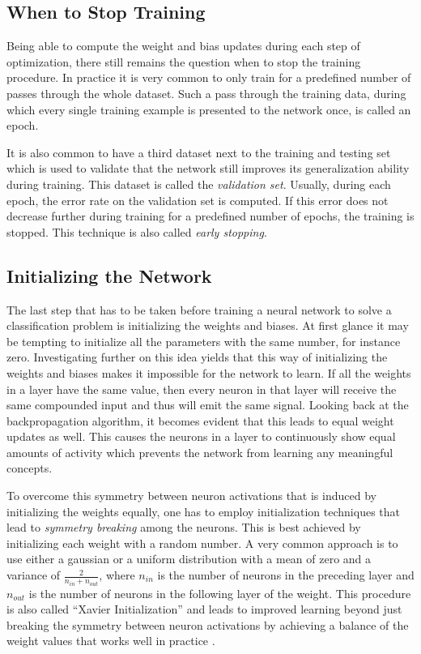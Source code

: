 \subsection{When to Stop Training}

Being able to compute the weight and bias updates during each step of
optimization, there still remains the question when to stop the
training procedure. In practice it is very common to only train for a
predefined number of passes through the whole dataset. Such a pass
through the training data, during which every single training example
is presented to the network once, is called an epoch.

It is also common to have a third dataset next to the training and
testing set which is used to validate that the network still improves
its generalization ability during training. This dataset is called the
\textit{validation set}. Usually, during each epoch,
the error rate on the validation set is computed. If this error does
not decrease further during training for a predefined number of
epochs, the training is stopped. This technique is also called
\textit{early stopping}.

\subsection{Initializing the Network}
\label{sec:xavier}

The last step that has to be taken before training a neural network
to solve a classification problem is initializing the weights and
biases. At first glance it may be tempting to initialize all the
parameters with the same number, for instance zero. Investigating further
on this idea yields that this way of initializing the weights and
biases makes it impossible for the network to learn. If all the
weights in a layer have the same value, then every neuron in that
layer will receive the same compounded input and thus will emit the same
signal. Looking back at the backpropagation algorithm, it becomes
evident that this leads to equal weight updates as well. This causes
the neurons in a layer to continuously show equal amounts of activity
which prevents the network from learning any meaningful concepts.

To overcome this
symmetry between neuron activations that is induced by initializing
the weights equally, one has to employ initialization techniques that
lead to \textit{symmetry breaking} among the neurons. This is best
achieved by initializing each weight with a random number. A very
common approach is to use either a gaussian or a uniform distribution
with a mean of zero and a variance of \(\frac{2}{n_{in} + n_{out}}\),
where \(n_{in}\) is the number of neurons in the preceding layer and
\(n_{out}\) is the number of neurons in the following layer of the
weight. This procedure is also called ``Xavier Initialization'' and
leads to improved learning beyond just breaking the symmetry between
neuron activations by achieving a balance of the weight values that
works well in practice \cite{Glorot2010}.
